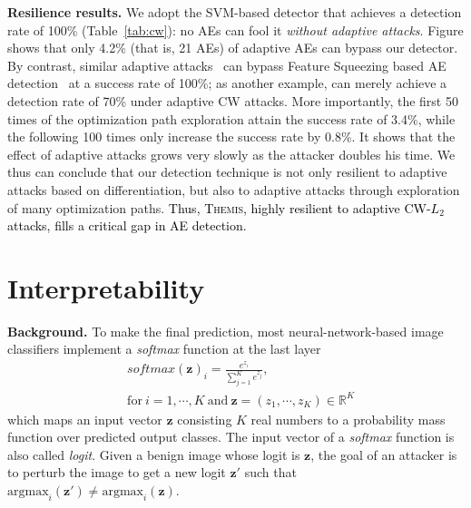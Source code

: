 \documentclass[sigconf]{acmart}
\newcommand{\oursys}{\textsc{Themis}\xspace}
\newcommand{\zedit}[1]{\textcolor{black}{#1}}
\begin{document}
\vspace{3pt}
\noindent \textbf{Resilience results.}
We adopt the SVM-based detector that achieves a detection rate of 100\%  (Table~\ref{tab:cw}): no AEs can fool it \emph{without adaptive attacks}. 
Figure shows that only 4.2\% (that is, 21 AEs) of adaptive AEs can bypass our detector. By contrast, similar adaptive attacks~\cite{he2017adversarial} 
can bypass Feature Squeezing based AE detection~\cite{xu2017feature} at a success rate of 100\%;
as another example, \cite{tian2018detecting} can merely achieve a detection rate of 70\% under adaptive CW attacks.
More importantly,  the first 50 times of the optimization path exploration attain the success
rate of 3.4\%, while the following 100 times only increase the success rate by 0.8\%.
It shows that the effect of adaptive attacks grows very slowly as the attacker doubles his time. 
We thus can conclude that our detection technique is not only resilient to adaptive attacks 
based on differentiation, but also to adaptive attacks through exploration of many optimization paths. 
\zedit{Thus, \oursys, highly resilient to adaptive CW-$L_2$ attacks, fills a critical gap in AE detection.}

\section{Interpretability}\label{sec:interp}

\vspace{3pt}
\noindent\textbf{Background.} To make the final prediction, most neural-network-based image classifiers implement a \textit{softmax} function at the last layer
\begin{equation}
\begin{aligned}
&softmax(\mathbf{z})_i =\frac{e^{z_i}}{\sum^K_{j=1}e^{z_j}},\\ 
&\mathrm{for}\ i=1,\cdots,K\ \mathrm{and}\ \mathbf{z} =(z_1,\cdots,z_K)\in \mathbb{R}^K
\end{aligned}
\end{equation}
which maps an input vector $\mathbf{z}$ consisting $K$ real numbers
to a probability mass function over predicted output classes. The input vector of a \textit{softmax} function is also called \textit{logit}. Given a benign image whose logit is $\mathbf{z}$, the 
goal of an attacker is to perturb the image to get a new logit $\mathbf{z}'$ such that $\mathrm{argmax}_i(\mathbf{z}')\neq \mathrm{argmax}_i(\mathbf{z})$.
\end{document}
